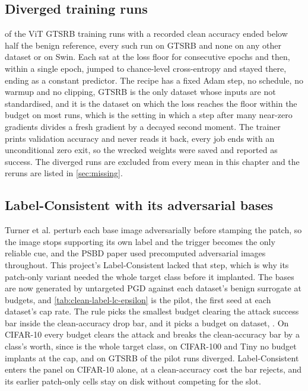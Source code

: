 \documentclass[../main.tex]{subfiles}
\begin{document}


\subsection{Diverged training runs}

\GtsrbDivergedRuns{} of the \GtsrbRunsScored{} ViT GTSRB training runs with a recorded clean accuracy ended below half the benign reference, every such run on GTSRB and none on any other dataset or on Swin. Each sat at the loss floor for consecutive epochs and then, within a single epoch, jumped to chance-level cross-entropy and stayed there, ending as a constant predictor. The recipe has a fixed Adam step, no schedule, no warmup and no clipping, GTSRB is the only dataset whose inputs are not standardised, and it is the dataset on which the loss reaches the floor within the budget on most runs, which is the setting in which a step after many near-zero gradients divides a fresh gradient by a decayed second moment. The trainer prints validation accuracy and never reads it back, every job ends with an unconditional zero exit, so the wrecked weights were saved and reported as success. The diverged runs are excluded from every mean in this chapter and the reruns are listed in \cref{sec:missing}.

\subsection{Label-Consistent with its adversarial bases}

Turner et al. perturb each base image adversarially before stamping the patch, so the image stops supporting its own label and the trigger becomes the only reliable cue, and the PSBD paper used precomputed adversarial images throughout. This project's Label-Consistent lacked that step, which is why its patch-only variant needed the whole target class before it implanted. The bases are now generated by untargeted PGD against each dataset's benign surrogate at \LcEpsilonBudgets{} budgets, and \cref{tab:clean-label-lc-epsilon} is the pilot, the first seed at each dataset's cap rate. The rule picks the smallest budget clearing the attack success bar inside the clean-accuracy drop bar, and it picks a budget on \LcDatasetsWithEpsilon{} dataset, \LcEpsilonChosen{}. On CIFAR-10 every budget clears the attack and breaks the clean-accuracy bar by a class's worth, since \PanelRateHigh{} is the whole target class, on CIFAR-100 and Tiny no budget implants at the cap, and on GTSRB \LcGtsrbPilotDiverged{} of the \LcGtsrbPilotRuns{} pilot runs diverged. Label-Consistent enters the panel on CIFAR-10 alone, at a clean-accuracy cost the bar rejects, and its earlier patch-only cells stay on disk without competing for the slot.
\end{document}
